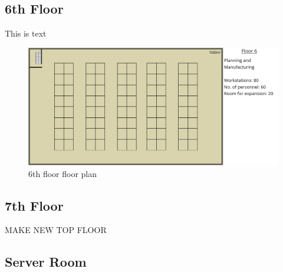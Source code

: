 \subsection{6th Floor}
This is text
\begin{figure}[!h]
    \includegraphics[width=15cm]{Figures/6th-Floor.png}
    \caption{6th floor floor plan}
    \label{6th_floor}
\end{figure}
\subsection{7th Floor}
\begin{huge}
    MAKE NEW TOP FLOOR
\end{huge}
\subsection{Server Room}